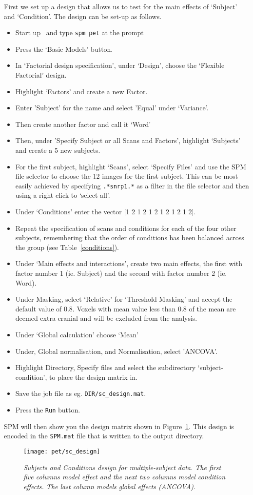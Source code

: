 First we set up a design that allows us to test for the main effects of `Subject' and `Condition'. The design can be set-up as follows.
\begin{itemize}
\item{Start up \matlab\ and type \texttt{spm pet} at the prompt}
\item{Press the `Basic Models' button.}
\item{In `Factorial design specification', under `Design', choose the `Flexible Factorial' design.}
\item{Highlight `Factors' and create a new Factor.}
\item{Enter 'Subject' for the name and select 'Equal' under `Variance'.}
\item{Then create another factor and call it `Word'}
\item{Then, under 'Specify Subject or all Scans and Factors', highlight `Subjects' and create a 5 new subjects.}
\item{For the first subject, highlight `Scans', select `Specify Files' and use the SPM file selector to choose the 12 images for the first subject. This can be most easily achieved by specifying \texttt{.*snrp1.*} as a filter in the file selector and then using a right click to `select all'.}
\item{Under `Conditions' enter the vector [1 2 1 2 1 2 1 2 1 2 1 2].}
\item{Repeat the specification of scans and conditions for each of the four other subjects, remembering that the order of conditions has been balanced across the group (see Table~\ref{conditions}).}
\item{Under `Main effects and interactions', create two main effects, the first with factor number 1 (ie. Subject) and the second with factor number 2 (ie. Word).}
\item{Under Masking, select `Relative' for `Threshold Masking' and accept the default value of 0.8. Voxels with mean value less than 0.8 of the mean are deemed extra-cranial and will be excluded from the analysis.}
\item{Under `Global calculation' choose `Mean'}
\item{Under, Global normalisation, and Normalisation, select 'ANCOVA'.}
\item{Highlight Directory, Specify files and select the subdirectory `subject-condition', to place the design matrix in.}
\item{Save the job file as eg. \texttt{DIR/sc\_design.mat}.}
\item{Press the \texttt{Run} button.}
\end{itemize}
SPM will then show you the design matrix shown in Figure~\ref{sc_design}. This design is encoded in the \texttt{SPM.mat} file that is written to the output directory.
\begin{figure}
\begin{center}
\texttt{[image: pet/sc\_design]}
\caption{\em Subjects and Conditions design for multiple-subject data. The first five columns model effect and the next two columns model condition effects. The last column models global effects (ANCOVA).  \label{sc_design}}
\end{center}
\end{figure}

